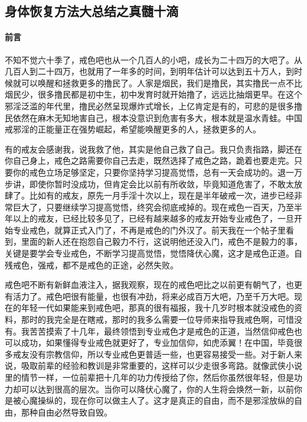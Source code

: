 \subsection{身体恢复方法大总结之真髓十滴}\label{60}

\paragraph*{前言}

不知不觉六十季了，戒色吧也从一个几百人的小吧，成长为二十四万的大吧了。从几百人到二十四万，也就用了一年多的时间，到明年估计可以达到五十万人，到时候就可以唤醒和拯救更多的撸民了。人家是烟民，我们是撸民，其实撸民一点不比烟民少，很多撸民都是初中生，初中发育时就开始撸了，远远比抽烟更早。在这个邪淫泛滥的年代里，撸民必然呈现爆炸式增长，上亿肯定是有的，可悲的是很多撸民依然在麻木无知地害自己，根本没意识到危害有多大，根本就是温水青蛙。中国戒邪淫的正能量正在强势崛起，希望能唤醒更多的人，拯救更多的人。

有的戒友会感谢我，说我救了他，其实是他自己救了自己。我只负责指路，脚还在你自己身上，戒色之路需要你自己去走，既然选择了戒色之路，跪着也要走完。只要你的戒色立场足够坚定，只要你坚持学习提高觉悟，总有一天会成功的。退一万步讲，即使你暂时没成功，但肯定会比以前有所收敛，毕竟知道危害了，不敢太放肆了。比如有的戒友，原先一月手淫十次以上，现在是半年破戒一次，进步已经非常巨大了，只要继续学习提高觉悟，终究会彻底戒掉的。现在戒色一百天，乃至半年以上的戒友，已经比较多见了，已经有越来越多的戒友开始专业戒色了，一旦开始专业戒色，就算正式入门了，不再是戒色的门外汉了。前天我在一个帖子里看到，里面的新人还在抱怨自己毅力不行，这说明他还没入门，戒色不是毅力的事，关键是要学会专业戒色，不断学习提高觉悟，觉悟降伏心魔，这才是戒色正道。自残戒色，强戒，都不是戒色的正途，必然失败。

戒色吧不断有新鲜血液注入，据我观察，现在的戒色吧比之以前更有朝气了，也更有活力了。戒色吧很有能量，也很有冲劲，将来必成百万大吧，乃至千万大吧。现在的年轻一代如果能来到戒色吧，那真的很有福报，我十几岁时根本就没戒色的资料，那时的我完全是在瞎戒，那时的我多么需要一位导师来指导我戒色啊，可惜没有。我苦苦摸索了十几年，最终领悟到专业戒色才是戒色的正道，当然信仰戒色也可以成功，如果懂得专业戒色就更好了，专业加信仰，如虎添翼！在中国，毕竟很多戒友没有宗教信仰，所以专业戒色更普适一些，也更容易接受一些。对于新人来说，吸取前辈的经验和教训是非常重要的，这样可以少走很多弯路。就像武侠小说里的情节一样，一位前辈把十几年的功力传授给了你，然后你虽然很年轻，但是功力却可以达到很高的层次。当你可以降伏心魔了，你的人生将会焕然一新，以前你是被心魔操纵的，现在你可以做主人了。这才是真正的自由，而不是邪淫放纵的自由，那种自由必然导致自毁。

